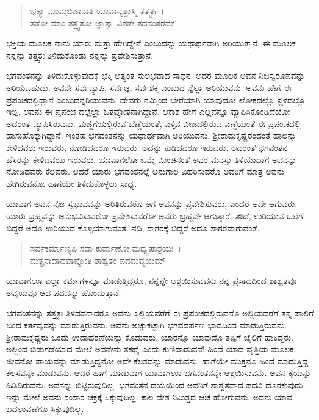 \begin{verse}
ಭಕ್ತ್ಯಾ ಮಾಮಭಿಜಾನಾತಿ ಯಾವಾನ್ಯಶ್ಚಾಸ್ಮಿ ತತ್ತ್ವತಃ~।\\ತತೋ ಮಾಂ ತತ್ತ್ವತೋ ಜ್ಞಾತ್ವಾ ವಿಶತೇ ತದನಂತರಮ್ 
\end{verse}

{\small ಭಕ್ತಿಯ ಮೂಲಕ ನಾನು ಯಾರು ಮತ್ತು ಹೇಗಿದ್ದೇನೆ ಎಂಬುದನ್ನು ಯಥಾರ್ಥವಾಗಿ ಅರಿಯುತ್ತಾನೆ. ಈ ಮೂಲಕ ನನ್ನನ್ನು ತತ್ತ್ವತಃ ತಿಳಿದುಕೊಂಡು ನನ್ನನ್ನು ಪ್ರವೇಶಿಸುತ್ತಾನೆ.}

ಭಗವಂತನನ್ನು ತಿಳಿದುಕೊಳ್ಳುವುದಕ್ಕೆ ಭಕ್ತಿ ಅತ್ಯಂತ ಸುಲಭವಾದ ಸಾಧನ. ಅದರ ಮೂಲಕ ಅವನ ನಿಜಸ್ವರೂಪವನ್ನು ಅರಿಯಬಹುದು. ಅವನೇ ಸರ್ವವ್ಯಾಪಿ, ಸರ್ವಜ್ಞ, ಸರ್ವಶಕ್ತ ಎಂಬುದ ನ್ನೆಲ್ಲಾ ಅರಿಯುವನು. ಅವನು ಹೇಗೆ ಈ ಪ್ರಪಂಚದಲ್ಲಿದ್ದಾನೆ ಎಂಬುದನ್ನರಿಯುವನು. ದೇವರು ನಮ್ಮಿಂದ ಬೇರೆಯಾಗಿ ಯಾವುದೋ ಲೋಕದಲ್ಲೊ ಸ್ಥಳದಲ್ಲೊ ಇಲ್ಲ. ಅವನು ಈ ಪ್ರಪಂಚ ದಲ್ಲೆಲ್ಲಾ ಓತಪ್ರೋತನಾಗಿದ್ದಾನೆ. ಆಕಾಶ ಹೇಗೆ ಎಲ್ಲವನ್ನೂ ವ್ಯಾಪಿಸಿಕೊಂಡಿದೆಯೋ ಅದರಂತೆ ವ್ಯಾಪಿಸಿರುವನು. ಮಜ್ಜಿಗೆಯಲ್ಲಿರುವ ಬೆಣ್ಣೆಯಂತೆ, ಎಳ್ಳಿನ ಬೀಜದಲ್ಲಿರುವ ಎಣ್ಣೆಯಂತೆ ಈ ಪ್ರಪಂಚದಲ್ಲಿ ಹಾಸುಹೊಕ್ಕಾಗಿದ್ದಾನೆ. ಇಂತಹ ಭಗವಂತನನ್ನು ಯಥಾರ್ಥವಾಗಿ ಅರಿಯುವನು. ಶ‍್ರೀರಾಮಕೃಷ್ಣರಂದಂತೆ ಹಾಲನ್ನು ಕೇಳಿದವರು ಇರುವರು, ನೋಡಿದವರೂ ಇರುವರು. ಅದನ್ನು ಕುಡಿದವರೂ ಇರುವರು. ಅದರಂತೆ ಭಗವಂತನ ಹೆಸರನ್ನು ಕೇಳಿದವರೂ ಇರುವರು, ಯಾವಾಗಲೋ ಒಮ್ಮೆ ಮಿಂಚಿನಂತೆ ಅವರ ಮನಸ್ಸು ತಿಳಿಯಾದಾಗ ಅವನನ್ನು ನೋಡಿದವರು ಕೆಲವರು. ಆದರೆ ಯಾರು ಭಗವಂತನಲ್ಲೆ ಅನುಗಾಲ ವಿಹರಿಸುವರೊ ಅವರಿಗೆ ಮಾತ್ರ ಅವನು ಹೇಗಿರುವನೋ ಹಾಗೆಯೇ ತಿಳಿದುಕೊಳ್ಳಲು ಸಾಧ್ಯ.

ಯಾವಾಗ ಅವನ ನೈಜ ಸ್ವಭಾವವನ್ನು ಅರಿತಿರುವರೊ ಆಗ ಅವನನ್ನು ಪ್ರವೇಶಿಸುವರು, ಎಂದರೆ ಅದೇ ಆಗುವರು. ಯಾರು ಬ್ರಹ್ಮವನ್ನು ಅನುಭವಿಸುವರೋ ಪ್ರವೇಶಿಸುವರೋ ಅವರು ಬ್ರಹ್ಮವೇ ಆಗುತ್ತಾರೆ. ಸೌದೆ, ಉರಿಯುವ ಒಲೆಗೆ ಬಿದ್ದರೆ ಅದೂ ಉರಿಯುವ ಕೊಳ್ಳಿಯಾಗುವಂತೆ. ನದಿ, ಸಾಗರಕ್ಕೆ ಬಿದ್ದರೆ ಅದೂ ಸಾಗರವಾಗುವಂತೆ.

\begin{verse}
ಸರ್ವಕರ್ಮಾಣ್ಯಪಿ ಸದಾ ಕುರ್ವಾಣೋ ಮದ್ವ್ಯಪಾಶ್ರಯಃ~।\\ಮತ್ಪ್ರಸಾದಾದವಾಪ್ನೋತಿ ಶಾಶ್ವತಂ ಪದಮವ್ಯಯಮ್ 
\end{verse}

{\small ಯಾವಾಗಲೂ ಎಲ್ಲಾ ಕರ್ಮಗಳನ್ನೂ ಮಾಡುತ್ತಿದ್ದರೂ, ನನ್ನನ್ನೇ ಆಶ್ರಯಿಸುವವನು ನನ್ನ ಪ್ರಸಾದದಿಂದ ಶಾಶ್ವತವೂ ಅವ್ಯಯವೂ ಆದ ಪದವನ್ನು ಹೊಂದುತ್ತಾನೆ.}

ಭಗವಂತನನ್ನು ತತ್ತ್ವತಃ ತಿಳಿದವನಾದರೂ ಅವನು ಎಲ್ಲಿಯವರೆಗೆ ಈ ಪ್ರಪಂಚದಲ್ಲಿರುವನೊ ಅಲ್ಲಿಯವರೆಗೆ ತನ್ನ ಪಾಲಿಗೆ ಬಂದ ಕರ್ತವ್ಯವನ್ನು ಮಾಡುತ್ತಿರುವನು. ಅವನು ಅಚ್ಚುಕಟ್ಟಾಗಿ ಭಗವದರ್ಪಣ ಭಾವದಿಂದ ಮಾಡುತ್ತಿರುವನು. ಶ‍್ರೀರಾಮಕೃಷ್ಣರು ಒಂದು ಉದಾಹರಣೆಯನ್ನು ಕೊಡುವರು. ಯಾರನ್ನೊ ಯಾವುದೊ ತಪ್ಪಿಗೆ ಜೈಲಿಗೆ ಹಾಕಿದ್ದರು. ಅಲ್ಲಿಂದ ಬಿಡುಗಡೆಯಾದ ಮೇಲೆ ಅವನೇನು ತಕಥೈ ಎಂದು ಕುಣಿದಾಡುವನೆ! ಹಿಂದೆ ಯಾವ ವೃತ್ತಿಯ ಮೂಲಕ ಜೀವನೋ ಪಾಯವನ್ನು ಮಾಡುತ್ತಿದ್ದನೋ ಅದೇ ಕೆಲಸವನ್ನು ಮಾಡುವನು. ಹಾಗೆಯೇ ಮುಕ್ತನೂ ಹಿಂದೆ ಮಾಡುತ್ತಿದ್ದ ಕೆಲಸವನ್ನೇ ಮಾಡುವನು. ಆದರೆ ಹಾಗೆ ಮಾಡುವಾಗ ಯಾವಾಗಲೂ ಭಗವಂತನನ್ನೇ ಆಶ್ರಯಿಸುವನು. ಅವನ ಕೈಯನ್ನು ಹಿಡಿದಿರುವನು. ಅವನನ್ನು ಬಿಟ್ಟಿರುವುದಿಲ್ಲ. ಭಗವಂತನ ದಯೆಯಿಂದ ಅವನಿಗೆ ಶಾಶ್ವತವಾದ ಪದವಿ ದೊರಕುವುದು. ಇನ್ನು ಮೇಲೆ ಅವನು ಸಂಸಾರ ಚಕ್ರಕ್ಕೆ ಸಿಕ್ಕುವುದಿಲ್ಲ. ಕಾಲ ದೇಶ ನಿಮಿತ್ತದ ಆಚೆ ಹೋಗುವನು. ಅವನು ಯಾವ ಬದಲಾವಣೆಗೂ ಸಿಕ್ಕುವುದಿಲ್ಲ.

